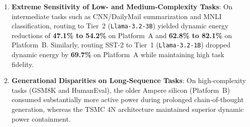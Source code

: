 \documentclass[runningheads]{llncs}
\begin{document}
\begin{enumerate}
    \item \textbf{Extreme Sensitivity of Low- and Medium-Complexity Tasks}: On intermediate tasks such as CNN/DailyMail summarization and MNLI classification, routing to Tier~2 (\texttt{Llama-3.2-3B}) yielded dynamic energy reductions of \textbf{47.1\% to 54.2\%} on Platform~A and \textbf{62.8\% to 82.1\%} on Platform~B. Similarly, routing SST-2 to Tier~1 (\texttt{Llama-3.2-1B}) dropped dynamic energy by \textbf{69.7\%} on Platform~A while maintaining high task fidelity.
    \item \textbf{Generational Disparities on Long-Sequence Tasks}: On high-complexity tasks (GSM8K and HumanEval), the older Ampere silicon (Platform~B) consumed substantially more active power during prolonged chain-of-thought generation, whereas the TSMC 4N architecture maintained superior dynamic power containment.
\end{enumerate}
\end{document}
